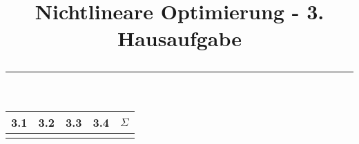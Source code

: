 \documentclass[11p,a4paper]{article}
\begin{document}
\title{\textbf{Nichtlineare Optimierung - 3. Hausaufgabe} \\ \rule{\textwidth}{1pt}}
\date{}

\clearpage\maketitle
\thispagestyle{empty}
\ourtitle
\setcounter{page}{0}


\vspace{2.5cm}
\begin{center}
\huge
\begin{tabular}{c*{3}{|c}||c}
3.1 & 3.2 & 3.3 & 3.4 & $\Sigma$ \\\hline
&&&& \\
\end{tabular}
\end{center}
\vspace{2cm}






%
\end{document}
